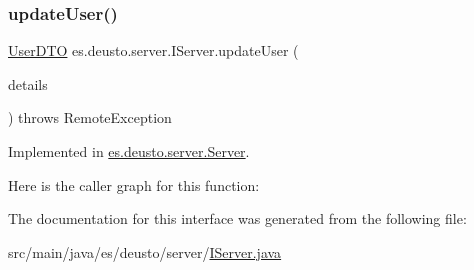 \subsubsection{\texorpdfstring{updateUser()}{updateUser()}}
{\footnotesize\ttfamily \mbox{\hyperlink{classes_1_1deusto_1_1server_1_1data_1_1_user_d_t_o}{User\+D\+TO}} es.\+deusto.\+server.\+I\+Server.\+update\+User (\begin{DoxyParamCaption}\item[{\mbox{\hyperlink{classes_1_1deusto_1_1server_1_1data_1_1_user_details_d_t_o}{User\+Details\+D\+TO}}}]{details }\end{DoxyParamCaption}) throws Remote\+Exception}



Implemented in \mbox{\hyperlink{classes_1_1deusto_1_1server_1_1_server_a74082f91af2065cd600c147296090921}{es.\+deusto.\+server.\+Server}}.

Here is the caller graph for this function\+:


The documentation for this interface was generated from the following file\+:\begin{DoxyCompactItemize}
\item 
src/main/java/es/deusto/server/\mbox{\hyperlink{_i_server_8java}{I\+Server.\+java}}\end{DoxyCompactItemize}
